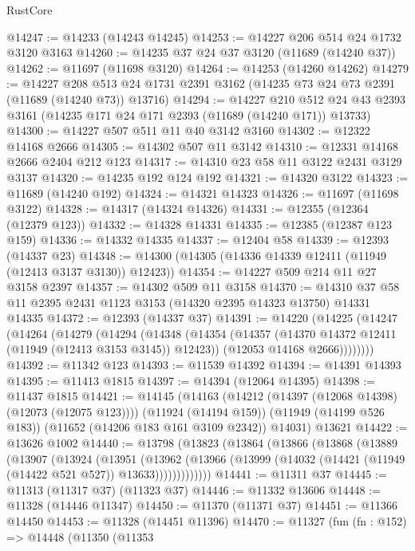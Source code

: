 \begin{lexlean}{RustCore}
\begin{coremodule}
@14247 := @14233 (@14243 @14245)
@14253 := @14227 @206 @514 @24 @1732 @3120 @3163
@14260 := @14235 @37 @24 @37 @3120 (@11689 (@14240 @37))
@14262 := @11697 (@11698 @3120)
@14264 := @14253 (@14260 @14262)
@14279 := @14227
    @208
    @513
    @24
    @1731
    @2391
    @3162
    (@14235 @73 @24 @73 @2391 (@11689 (@14240 @73)) @13716)
@14294 := @14227
    @210
    @512
    @24
    @43
    @2393
    @3161
    (@14235 @171 @24 @171 @2393 (@11689 (@14240 @171)) @13733)
@14300 := @14227 @507 @511 @11 @40 @3142 @3160
@14302 := @12322 @14168 @2666
@14305 := @14302 @507 @11 @3142
@14310 := @12331 @14168 @2666 @2404 @212 @123
@14317 := @14310 @23 @58 @11 @3122 @2431 @3129 @3137
@14320 := @14235 @192 @124 @192
@14321 := @14320 @3122
@14323 := @11689 (@14240 @192)
@14324 := @14321 @14323
@14326 := @11697 (@11698 @3122)
@14328 := @14317 (@14324 @14326)
@14331 := @12355 (@12364 (@12379 @123))
@14332 := @14328 @14331
@14335 := @12385 (@12387 @123 @159)
@14336 := @14332 @14335
@14337 := @12404 @58
@14339 := @12393 (@14337 @23)
@14348 := @14300 (@14305 (@14336 @14339 @12411 (@11949 (@12413 @3137 @3130)) @12423))
@14354 := @14227 @509 @214 @11 @27 @3158 @2397
@14357 := @14302 @509 @11 @3158
@14370 := @14310 @37 @58 @11 @2395 @2431 @1123 @3153 (@14320 @2395 @14323 @13750) @14331 @14335
@14372 := @12393 (@14337 @37)
@14391 := @14220
    (@14225
      (@14247
        (@14264
          (@14279
            (@14294
              (@14348
                (@14354
                  (@14357 (@14370 @14372 @12411 (@11949 (@12413 @3153 @3145)) @12423))
                  (@12053 @14168 @2666))))))))
@14392 := @11342 @123
@14393 := @11539 @14392
@14394 := @14391 @14393
@14395 := @11413 @1815
@14397 := @14394 (@12064 @14395)
@14398 := @11437 @1815
@14421 := @14145
    (@14163
      (@14212 (@14397 (@12068 @14398) (@12073 (@12075 @123))))
      (@11924 (@14194 @159))
      (@11949 (@14199 @526 @183))
      (@11652 (@14206 @183 @161 @3109 @2342))
      @14031)
    @13621
@14422 := @13626 @1002
@14440 := @13798
    (@13823
      (@13864
        (@13866
          (@13868
            (@13889
              (@13907
                (@13924
                  (@13951
                    (@13962
                      (@13966
                        (@13999 (@14032 (@14421 (@11949 (@14422 @521 @527)) @13633)))))))))))))
@14441 := @11311 @37
@14445 := @11313 (@11317 @37) (@11323 @37)
@14446 := @11332 @13606
@14448 := @11328 (@14446 @11347)
@14450 := @11370 (@11371 @37)
@14451 := @11366 @14450
@14453 := @11328 (@14451 @11396)
@14470 := @11327
    (fun (fn : @152) =>
    @14448
      (@11350
        (@11353

\end{coremodule}
\end{lexlean}
